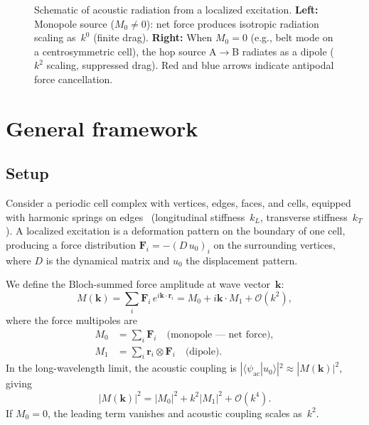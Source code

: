 \documentclass[12pt]{article}
\newcommand{\vk}{\bm{k}}
\newcommand{\vvr}{\bm{r}}
\newcommand{\vF}{\bm{F}}
\begin{document}
\begin{figure}[t]
\caption{Schematic of acoustic radiation from a localized excitation.
\textbf{Left:} Monopole source ($M_0 \neq 0$): net force produces
isotropic radiation scaling as~$k^0$ (finite drag).
\textbf{Right:} When $M_0 = 0$ (e.g., belt mode on a centrosymmetric
cell), the hop source A$\to$B radiates as a dipole ($k^2$ scaling,
suppressed drag).  Red and blue arrows indicate antipodal force
cancellation.}
\label{fig:schematic}
\end{figure}

\section{General framework}
\label{sec:framework}

\subsection{Setup}
\label{sec:setup}

Consider a periodic cell complex with vertices, edges, faces, and
cells, equipped with harmonic springs on edges~\cite{BornHuang}
(longitudinal stiffness~$k_L$, transverse stiffness~$k_T$).  A localized
excitation is a deformation pattern on the boundary of one cell,
producing a force distribution $\vF_i = -(D\, u_0)_i$ on the
surrounding vertices, where $D$ is the dynamical matrix and $u_0$ the
displacement pattern.

We define the Bloch-summed force amplitude at wave vector~$\vk$:
\begin{equation}
  M(\vk) = \sum_i \vF_i\, e^{i\vk \cdot \vvr_i}
  = M_0 + i\vk \cdot M_1 + \mathcal{O}(k^2),
\end{equation}
where the force multipoles are
\begin{align}
  M_0 &= \sum_i \vF_i \quad \text{(monopole --- net force)}, \\
  M_1 &= \sum_i \vvr_i \otimes \vF_i \quad \text{(dipole)}.
\end{align}
In the long-wavelength limit, the acoustic coupling is $|\langle
\psi_{\mathrm{ac}} | u_0 \rangle|^2 \approx |M(\vk)|^2$, giving
\begin{equation}
  |M(\vk)|^2 = |M_0|^2 + k^2 |M_1|^2 + \mathcal{O}(k^4).
  \label{eq:multipole}
\end{equation}
If $M_0 = 0$, the leading term vanishes and acoustic coupling scales
as~$k^2$.
\end{document}
